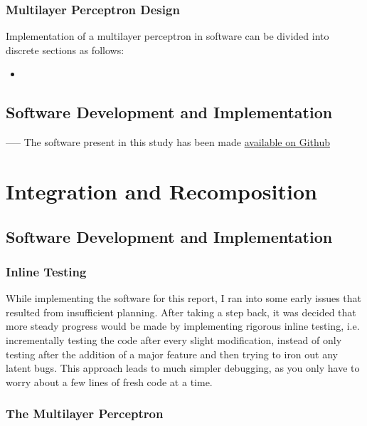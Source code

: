 \subsubsection{Multilayer Perceptron Design}

Implementation of a multilayer perceptron in software can be divided into discrete sections as follows:
\begin{itemize}
	\item
	
	
	
	
\end{itemize}


\subsection{Software Development and Implementation}




-----
The software present in this study has been made \href{http://github.com/roansong}{available on Github}

\section{Integration and Recomposition}
\subsection{Software Development and Implementation}

\subsubsection{Inline Testing}
While implementing the software for this report, I ran into some early issues that resulted from insufficient planning. After taking a step back, it was decided that more steady progress would be made by implementing rigorous inline testing, i.e. incrementally testing the code after every slight modification, instead of only testing after the addition of a major feature and then trying to iron out any latent bugs. This approach leads to much simpler debugging, as you only have to worry about a few lines of fresh code at a time.

\subsubsection{The Multilayer Perceptron}


